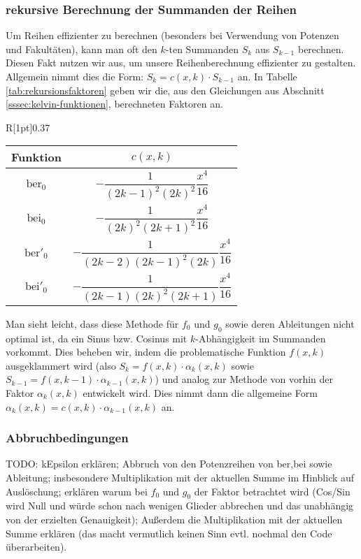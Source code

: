 \documentclass[10pt,a4paper]{article}
\begin{document}
\subsubsection{rekursive Berechnung der Summanden der Reihen}
Um Reihen effizienter zu berechnen (besonders bei Verwendung von Potenzen und Fakultäten), kann man oft den $k$-ten Summanden $S_k$ aus $S_{k-1}$ berechnen. Diesen Fakt nutzen wir aus, um unsere Reihenberechnung effizienter zu gestalten. Allgemein nimmt dies die Form: $S_k = c(x, k)\cdot S_{k-1}$ an.
In Tabelle \ref{tab:rekursionsfaktoren} geben wir die, aus den Gleichungen aus Abschnitt \ref{sssec:kelvin-funktionen}, berechneten Faktoren an.
\begin{wraptable}{R}[1pt]{0.37\textwidth}
\begin{tabular}{c|c}
Funktion & $c(x,k)$ \\\hline
\rule[-3.5ex]{0pt}{8ex} $\mathrm{ber}_0$ & $-\dfrac{1}{(2k-1)^2 (2k)^2}\dfrac{x^4}{16}$ \\ \hline
\rule[-3.5ex]{0pt}{8ex} $\mathrm{bei}_0$ & $-\dfrac{1}{(2k)^2 (2k+1)^2}\dfrac{x^4}{16}$ \\ \hline
\rule[-3.5ex]{0pt}{8ex} $\mathrm{ber}'_0$ & $-\dfrac{1}{(2k-2) (2k-1)^2 (2k)}\dfrac{x^4}{16}$ \\ \hline
\rule[-3.5ex]{0pt}{8ex} $\mathrm{bei}'_0$ & $-\dfrac{1}{(2k-1) (2k)^2 (2k+1)}\dfrac{x^4}{16}$
\end{tabular}
\caption{CAPTION}
\label{tab:rekursionsfaktoren}
\end{wraptable}\newline
Man sieht leicht, dass diese Methode für $f_0$ und $g_0$ sowie deren Ableitungen nicht optimal ist, da ein Sinus bzw. Cosinus mit $k$-Abhängigkeit im Summanden vorkommt.
Dies beheben wir, indem die problematische Funktion $f(x,k)$ ausgeklammert wird (also $S_k = f(x,k) \cdot \alpha_k(x,k)$ sowie $S_{k-1} = f(x,k-1) \cdot \alpha_{k-1}(x,k)$)
und analog zur Methode von vorhin der Faktor $\alpha_k(x,k)$ entwickelt wird. Dies nimmt dann die allgemeine Form $\alpha_k(x,k) = c(x,k)\cdot\alpha_{k-1}(x,k)$ an.
\subsubsection{Abbruchbedingungen}
TODO: kEpsilon erklären; Abbruch von den Potenzreihen von ber,bei sowie Ableitung; insbesondere Multiplikation mit der aktuellen Summe im Hinblick auf Auslöschung; erklären warum bei $f_0$ und $g_0$ der Faktor betrachtet wird (Cos/Sin wird Null und würde schon nach wenigen Glieder abbrechen und das unabhängig von der erzielten Genauigkeit); Außerdem die Multiplikation mit der aktuellen Summe erklären (das macht vermutlich keinen Sinn evtl. nochmal den Code überarbeiten).
\end{document}
